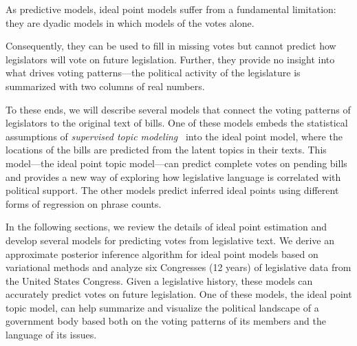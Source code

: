 
As predictive models, ideal point models suffer from a fundamental
limitation: they are dyadic models in which models of the votes alone.

Consequently, they can be used to fill in missing votes but cannot
predict how legislators will vote on future legislation.  Further,
they provide no insight into what drives voting patterns---the
political activity of the legislature is summarized with two columns
of real numbers.

To these ends, we will describe several models that connect the voting
patterns of legislators to the original text of bills.  One of these
models embeds the statistical assumptions of \textit{supervised topic
  modeling}~\cite{blei:2008} into the ideal point model, where the
locations of the bills are predicted from the latent topics in their
texts. This model---the ideal point topic model---can predict complete
votes on pending bills and provides a new way of exploring how
legislative language is correlated with political support.  The other
models predict inferred ideal points using different forms of
regression on phrase counts.

In the following sections, we review the details of ideal point
estimation and develop several models for predicting votes from
legislative text.  We derive an approximate posterior inference
algorithm for ideal point models based on variational methods and
analyze six Congresses (12 years) of legislative data from the United
States Congress.  Given a legislative history, these models can
accurately predict votes on future legislation.  One of these models,
the ideal point topic model, can help summarize and visualize the
political landscape of a government body based both on the voting
patterns of its members and the language of its issues.

